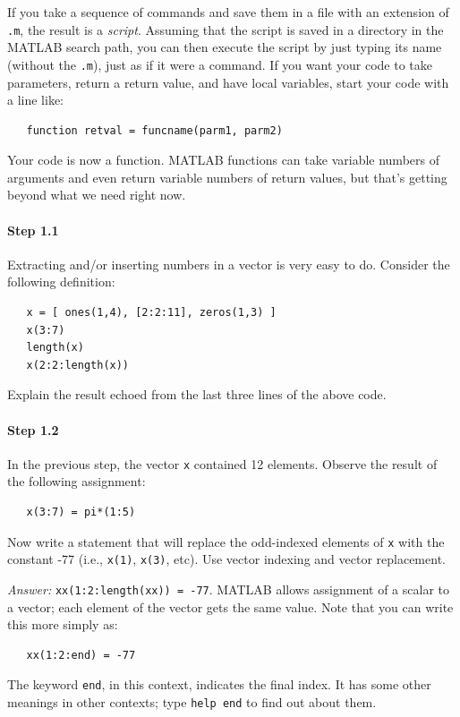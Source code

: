 If you take a sequence of commands and save them in a file with an
extension of \texttt{.m}, the result is a \emph{script}. Assuming that the
script is saved in a directory in the MATLAB search path, you can then
execute the script by just typing its name (without the \texttt{.m}),
just as if it were a command. If you want your code to take
parameters, return a return value, and have local variables, start
your code with a line like:
\begin{verbatim}
   function retval = funcname(parm1, parm2)
\end{verbatim}
Your code is now a function. MATLAB functions can take variable
numbers of arguments and even return variable numbers of return
values, but that's getting beyond what we need right now.

\paragraph{Step 1.1} Extracting and/or inserting numbers in a
vector is very easy to do. Consider the following definition:
\begin{verbatim}
   x = [ ones(1,4), [2:2:11], zeros(1,3) ]
   x(3:7)
   length(x)
   x(2:2:length(x))
\end{verbatim}
Explain the result echoed from the last three lines of the above code.

\paragraph{Step 1.2} In the previous step, the vector \texttt{x}
contained 12 elements. Observe the result of the following assignment:
\begin{verbatim}
   x(3:7) = pi*(1:5)
\end{verbatim}
Now write a statement that will replace the odd-indexed elements of
\texttt{x} with the constant -77 (i.e., \texttt{x(1)},
\texttt{x(3)}, etc). Use vector indexing and vector replacement.

\ifanswers
\textit{Answer:} \texttt{xx(1:2:length(xx)) = -77}. MATLAB allows
assignment of a scalar to a vector; each element of the vector gets
the same value. Note that you can write this more simply as:
\begin{verbatim}
   xx(1:2:end) = -77
\end{verbatim}
  The keyword \texttt{end}, in this context, indicates the final
  index. It has some other meanings in other contexts; type
  \texttt{help end} to find out about them.
\fi

